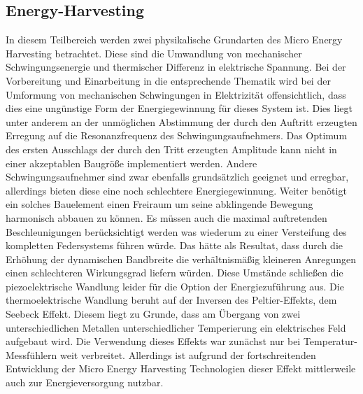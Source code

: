 \documentclass[12pt]{scrreprt} %
\begin{document}
\subsection{Energy-Harvesting}
\label{energy}
In diesem Teilbereich werden zwei physikalische Grundarten des Micro Energy Harvesting betrachtet. Diese sind die Umwandlung von mechanischer Schwingungsenergie und thermischer Differenz in elektrische Spannung. Bei der Vorbereitung und Einarbeitung in die entsprechende Thematik wird bei der Umformung von mechanischen Schwingungen in Elektrizität offensichtlich, dass dies eine ungünstige Form der Energiegewinnung für dieses System ist. Dies liegt unter anderem an der unmöglichen Abstimmung der durch den Auftritt erzeugten Erregung auf die Resonanzfrequenz des Schwingungsaufnehmers. Das Optimum des ersten Ausschlags der durch den Tritt erzeugten Amplitude kann nicht in einer akzeptablen Baugröße implementiert werden. Andere Schwingungsaufnehmer sind zwar ebenfalls grundsätzlich geeignet und erregbar, allerdings bieten diese eine noch schlechtere Energiegewinnung. Weiter benötigt ein solches Bauelement einen Freiraum um seine abklingende Bewegung harmonisch abbauen zu können. Es müssen auch die maximal auftretenden Beschleunigungen berücksichtigt werden was wiederum zu einer Versteifung des kompletten Federsystems führen würde. Das hätte als Resultat, dass durch die Erhöhung der dynamischen Bandbreite die verhältnismäßig kleineren Anregungen einen schlechteren Wirkungsgrad liefern würden. Diese Umstände schließen die piezoelektrische Wandlung leider für die Option der Energiezuführung aus. \citep[vgl. S.39]{Dembowski2011} \newline 
Die thermoelektrische Wandlung beruht auf der Inversen des Peltier-Effekts, dem Seebeck Effekt. Diesem liegt zu Grunde, dass am Übergang von zwei unterschiedlichen Metallen unterschiedlicher Temperierung ein elektrisches Feld aufgebaut wird. Die Verwendung dieses Effekts war zunächst nur bei Temperatur-Messfühlern weit verbreitet. Allerdings ist aufgrund der fortschreitenden Entwicklung der Micro Energy Harvesting Technologien dieser Effekt mittlerweile auch zur Energieversorgung nutzbar. \newline \newline
\end{document}
